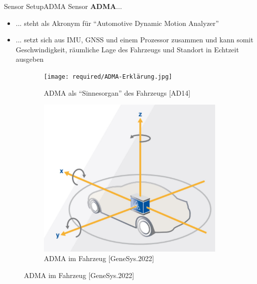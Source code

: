 \documentclass[169, handout	]{THIbeamer} %
\begin{document}
	\begin{frame}{Sensor Setup}{ADMA Sensor}
		\textbf{ADMA}...		
		\begin{itemize}
			\item ... steht als Akronym für \enquote{Automotive Dynamic Motion Analyzer}
			\item ... setzt sich aus IMU, GNSS und einem Prozessor zusammen und kann somit Geschwindigkeit, räumliche Lage des Fahrzeugs und Standort in Echtzeit ausgeben
		\end{itemize}
		\begin{figure}
			\centering
    		\begin{subfigure}[b]{0.3\textwidth}
				\texttt{[image: required/ADMA-Erklärung.jpg]}
				\caption{ADMA als \enquote{Sinnesorgan} des Fahrzeugs [AD14]}
        		\label{ADMA Erklärung}
   		 	\end{subfigure}
   		 	\hspace{3cm}
    		\begin{subfigure}[b]{0.3\textwidth}
				\includegraphics[scale=0.35]{required/ADMA.jpg}
				\caption{ADMA im Fahrzeug [GeneSys.2022]}
        		\label{ADMA in Fahrzeug}
    		\end{subfigure}
    		\label{ADMA figures} 
		\end{figure}
	\end{frame}
\end{document}
